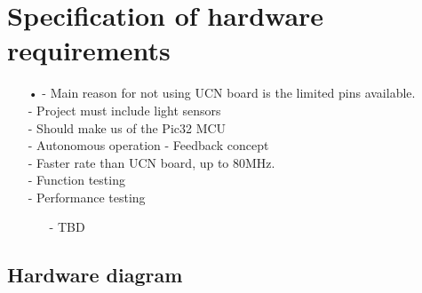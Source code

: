\section{Specification of hardware requirements}
\begin{enumerate}
	\item[•]- Main reason for not using UCN board is the limited pins available.
\\ - Project must include light sensors
\\ - Should make us of the Pic32 MCU
\\ - Autonomous operation - Feedback concept
\\ - Faster rate than UCN board, up to 80MHz.
\\ - Function testing
\\ - Performance testing

	\begin{enumerate}
		\item[-]TBD
	\end{enumerate}

\end{enumerate}
\subsection{Hardware diagram}
